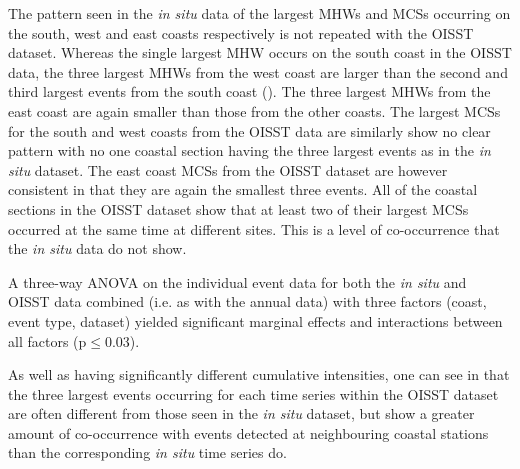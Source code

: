 \documentclass[a4paper,10pt,review]{elsarticle}
\begin{document}
The pattern seen in the \emph{in situ} data of the largest MHWs and MCSs occurring on the south, west and east coasts respectively is not repeated with the OISST dataset. Whereas the single largest MHW occurs on the south coast in the OISST data, the three largest MHWs from the west coast are larger than the second and third largest events from the south coast (). The three largest MHWs from the east coast are again smaller than those from the other coasts. The largest MCSs for the south and west coasts from the OISST data are similarly show no clear pattern with no one coastal section having the three largest events as in the \emph{in situ} dataset. The east coast MCSs from the OISST dataset are however consistent in that they are again the smallest three events. All of the coastal sections in the OISST dataset show that at least two of their largest MCSs occurred at the same time at different sites. This is a level of co-occurrence that the \emph{in situ} data do not show.

A three-way ANOVA on the individual event data for both the \emph{in situ} and OISST data combined (i.e. as with the annual data) with three factors (coast, event type, dataset) yielded significant marginal effects and interactions between all factors (p$\leq$0.03).

As well as having significantly different cumulative intensities, one can see in  that the three largest events occurring for each time series within the OISST dataset are often different from those seen in the \emph{in situ} dataset, but show a greater amount of co-occurrence with events detected at neighbouring coastal stations than the corresponding \emph{in situ} time series do.
\end{document}
